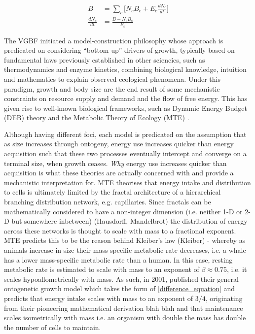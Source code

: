 \documentclass[a4paper]{article} %
\begin{document}
            \begin{align*}
                B &= \sum_c \Bigg[N_{c}B_{c} + E_{c}\frac{dN_{c}}{dt}\Bigg] \\
                \frac{dN_{c}}{dt} &= \frac{B - N_{c}B_{c}}{E_{c}}
            \end{align*}
            
            The VGBF initiated a model-construction philosophy whose approach is predicated on considering ``bottom-up'' drivers of growth, typically based on fundamental laws previously established in other sciencies, such as thermodynamics and enzyme kinetics, combining biological knowledge, intuition and mathematics to explain observed ecological phenomena. Under this paradigm, growth and body size are the end result of some mechanistic constraints on resource supply and demand and the flow of free energy. This has given rise to well-known biological frameworks, such as Dynamic Energy Budget (DEB) theory \autocite{kooijman2010dynamic} and the Metabolic Theory of Ecology (MTE) \autocite{Brown2004}. 
            
            Although having different foci, each model is predicated on the assumption that as size increases through ontogeny, energy use increases quicker than energy acquisition such that these two processes eventually intercept and converge on a terminal size, when growth ceases. \textit{Why} energy use increases quicker than acquisition is what these theories are actually concerned with and provide a mechanistic interpretation for. MTE theorises that energy intake and distribution to cells is ultimately limited by the fractal architecture of a hierarchical branching distribution network, e.g. capillaries. Since fractals can be mathematically considered to have a non-integer dimension (i.e. neither 1-D or 2-D but somewhere inbetween) (Hausdorff, Mandelbrot) the distribution of energy across these networks is thought to scale with mass to a fractional exponent.  MTE predicts this to be the reason behind Kleiber's law (Kleiber) - whereby as animals increase in size their mass-specific metabolic rate decreases, i.e. a whale has a lower mass-specific metabolic rate than a human. In this case, resting metabolic rate is estimated to scale with mass to an exponent of $\beta \approx 0.75$, i.e. it scales hypoallometrically with mass. As such, in 2001, \cite{West2001} published their general ontogenetic growth model 
            which takes the form of \eqref{difference_equation} and predicts that energy intake scales with mass to an exponent of $3/4$, originating from their pioneering mathematical derivation blah blah and that maintenance scales isometrically with mass i.e. an organism with double the mass has double the number of cells to maintain.
            
\end{document}
